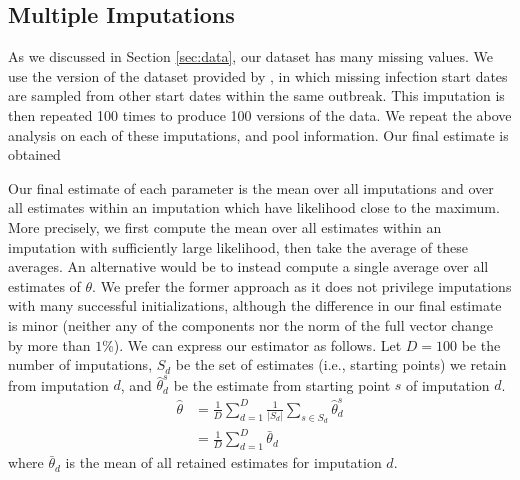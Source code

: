 \documentclass[11pt, oneside]{article}   	%
\begin{document}
\subsection{Multiple Imputations}
\label{sec:mult_imp}

As we discussed in Section \ref{sec:data}, our dataset has many missing values. We use the version of the dataset provided by \citet{Sto22}, in which missing infection start dates are sampled from other start dates within the same outbreak. This imputation is then repeated 100 times to produce 100 versions of the data. We repeat the above analysis on each of these imputations, and pool information. Our final estimate is obtained 

Our final estimate of each parameter is the mean over all imputations and over all estimates within an imputation which have likelihood close to the maximum. More precisely, we first compute the mean over all estimates within an imputation with sufficiently large likelihood, then take the average of these averages. An alternative would be to instead compute a single average over all estimates of $\theta$. We prefer the former approach as it does not privilege imputations with many successful initializations, although the difference in our final estimate is minor (neither any of the components nor the norm of the full vector change by more than $1\%$). We can express our estimator as follows. Let $D=100$ be the number of imputations, $S_d$ be the set of estimates (i.e., starting points) we retain from imputation $d$, and $\hat{\theta}_d^s$ be the estimate from starting point $s$ of imputation $d$.
%
\begin{align}
	\hat{\theta} &= \frac{1}{D} \sum_{d=1}^D \frac{1}{|S_d|} \sum_{s \in S_d} \hat{\theta}_d^s\\
	&= \frac{1}{D} \sum_{d=1}^D \bar{\theta}_d
\end{align}
%
where $\bar{\theta}_d$ is the mean of all retained estimates for imputation $d$.
\end{document}
